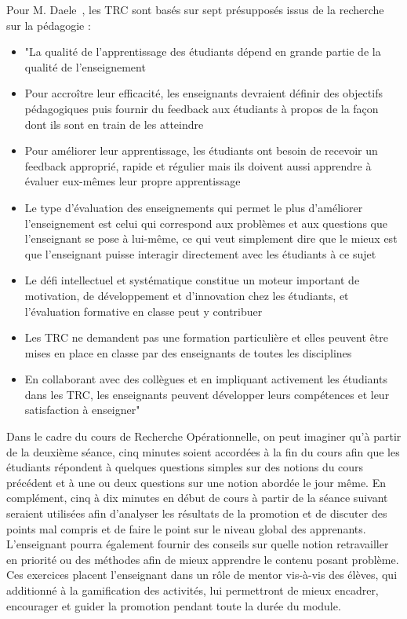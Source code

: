 Pour M. Daele~\cite{gamif-CATs}, les TRC sont basés sur sept présupposés issus de la recherche sur la pédagogie : 
\begin{itemize}
    \item "La qualité de l’apprentissage des étudiants dépend en grande partie de la qualité de l’enseignement
    \item Pour accroître leur efficacité, les enseignants devraient définir des objectifs pédagogiques puis fournir du feedback aux étudiants à propos de la façon dont ils sont en train de les atteindre
    \item Pour améliorer leur apprentissage, les étudiants ont besoin de recevoir un feedback approprié, rapide et régulier mais ils doivent aussi apprendre à évaluer eux-mêmes leur propre apprentissage
    \item Le type d’évaluation des enseignements qui permet le plus d’améliorer l’enseignement est celui qui correspond aux problèmes et aux questions que l’enseignant se pose à lui-même, ce qui veut simplement dire que le mieux est que l’enseignant puisse interagir directement avec les étudiants à ce sujet
    \item Le défi intellectuel et systématique constitue un moteur important de motivation, de développement et d’innovation chez les étudiants, et l’évaluation formative en classe peut y contribuer
    \item Les TRC ne demandent pas une formation particulière et elles peuvent être mises en place en classe par des enseignants de toutes les disciplines
    \item En collaborant avec des collègues et en impliquant activement les étudiants dans les TRC, les enseignants peuvent développer leurs compétences et leur satisfaction à enseigner"
\end{itemize}
\par 

Dans le cadre du cours de Recherche Opérationnelle, on peut imaginer qu'à partir de la deuxième séance, cinq minutes soient accordées à la fin du cours afin que les étudiants répondent à quelques questions simples sur des notions du cours précédent et à une ou deux questions sur une notion abordée le jour même. En complément, cinq à dix minutes en début de cours à partir de la séance suivant seraient utilisées afin d'analyser les résultats de la promotion et de discuter des points mal compris et de faire le point sur le niveau global des apprenants. L'enseignant pourra également fournir des conseils sur quelle notion retravailler en priorité ou des méthodes afin de mieux apprendre le contenu posant problème. Ces exercices placent l'enseignant dans un rôle de mentor vis-à-vis des élèves, qui additionné à la gamification des activités, lui permettront de mieux encadrer, encourager et guider la promotion pendant toute la durée du module.

